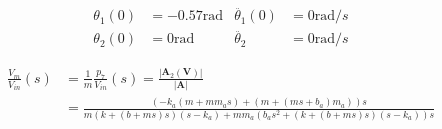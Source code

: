 \documentclass[12pt]{article}
\begin{document}
\begin{align}
    \theta_1(0) &= -0.57 \text{rad} & \ddot{\theta_1}(0) &= 0 \text{rad}/s \\
    \theta_2(0) &= 0 \text{rad} & \ddot{\theta_2} &= 0 \text{rad}/s
\end{align}

\begin{equation}
    \begin{split}
        \frac{V_m}{V_{in}}(s) &= \frac{1}{m}\frac{p_7}{V_{in}}(s) = \frac{\left\lvert \mathbf{A}_2\left(\mathbf{V}\right)\right\rvert}{\left\lvert \mathbf{A} \right\rvert} \\
        &= \frac{\left(-k_a \left(m+m m_a s\right)+ \left(m+\left(m s+b_a\right) m_a\right)\right)s}{m (k+ (b+m s)s) \left(s-k_a\right)+m m_a \left(b_as^2+(k+ (b+m s)s) \left(s-k_a\right)\right) s}
    \end{split}
\end{equation}
\end{document}

